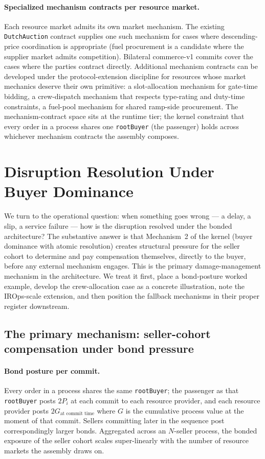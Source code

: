 \documentclass[11pt,a4paper]{article}
\theoremstyle{definition}
\theoremstyle{remark}
\begin{document}
\paragraph{Specialized mechanism contracts per resource market.}
Each resource market admits its own market mechanism. The
existing \texttt{DutchAuction} contract supplies one such
mechanism for cases where descending-price coordination is
appropriate (fuel procurement is a candidate where the supplier
market admits competition). Bilateral commerce-v1 commits cover
the cases where the parties contract directly. Additional
mechanism contracts can be developed under the protocol-extension
discipline for resources whose market mechanics deserve their own
primitive: a slot-allocation mechanism for gate-time bidding, a
crew-dispatch mechanism that respects type-rating and duty-time
constraints, a fuel-pool mechanism for shared ramp-side
procurement. The mechanism-contract space sits at the runtime
tier; the kernel constraint that every order in a process shares
one \texttt{rootBuyer} (the passenger) holds across whichever
mechanism contracts the assembly composes.

\section{Disruption Resolution Under Buyer Dominance}
\label{sec:disruption}

We turn to the operational question: when something goes wrong
--- a delay, a slip, a service failure --- how is the disruption
resolved under the bonded architecture? The substantive answer is
that Mechanism~2 of the kernel (buyer dominance with atomic
resolution) creates structural pressure for the seller cohort to
determine and pay compensation themselves, directly to the buyer,
before any external mechanism engages. This is the primary
damage-management mechanism in the architecture. We treat it
first, place a bond-posture worked example, develop the
crew-allocation case as a concrete illustration, note the
IROps-scale extension, and then position the fallback mechanisms
in their proper register downstream.

\subsection{The primary mechanism: seller-cohort compensation under bond pressure}

\paragraph{Bond posture per commit.}
Every order in a process shares the same \texttt{rootBuyer}; the
passenger as that \texttt{rootBuyer} posts $2P_i$ at each commit
to each resource provider, and each resource provider posts
$2G_{\text{at commit time}}$ where $G$ is the cumulative
process value at the moment of that commit. Sellers committing
later in the sequence post correspondingly larger bonds.
Aggregated across an $N$-seller process, the bonded exposure of
the seller cohort scales super-linearly with the number of
resource markets the assembly draws on.
\end{document}
